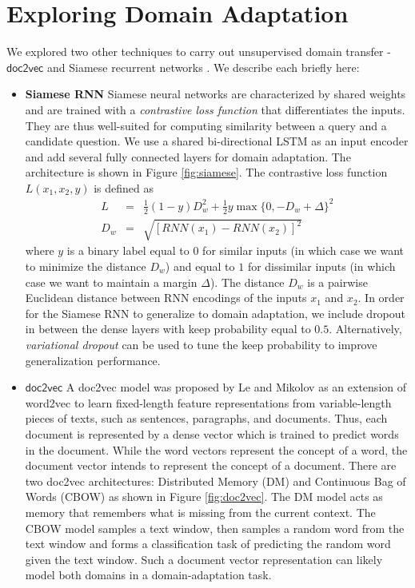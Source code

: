 \documentclass{sigkddExp}
\begin{document}
\section{Exploring Domain Adaptation}
\label{other_techniques}
We explored two other techniques to carry out unsupervised domain transfer - $\textsf{doc2vec}$ \cite{doc2vec1} and Siamese recurrent networks \cite{siamese}. We describe each briefly here:
\begin{itemize}[topsep=0pt,itemsep=-1ex,partopsep=1ex,parsep=1ex]

\item \textbf{Siamese RNN} 
 Siamese neural networks \cite{siamese} are characterized by shared weights and are trained with a \textit{contrastive loss function} that differentiates the inputs. They are thus well-suited for computing similarity between a query and a candidate question. We use a shared bi-directional LSTM as an input encoder and add several fully connected layers for domain adaptation. The architecture is shown in Figure \ref{fig:siamese}. The contrastive loss function $L(x_1,x_2,y)$ is defined as
\begin{eqnarray}
L &=& \frac{1}{2}(1-y)D_{w}^{2} + \frac{1}{2}y \max \{0, -D_w + \Delta\}^{2} \\
D_w &=& \sqrt{[RNN(x_1) - RNN(x_2)]^2}
\end{eqnarray}
where $y$ is a binary label equal to $0$ for similar inputs (in which case we want to minimize the distance $D_w$) and equal to $1$ for dissimilar inputs (in which case we want to maintain a margin $\Delta$). The distance $D_w$ is a pairwise Euclidean distance between RNN encodings of the inputs $x_1$ and $x_2$. In order for the Siamese RNN to generalize to domain adaptation, we include dropout\cite{srivastava2014dropout} in between the dense layers with keep probability equal to $0.5$. Alternatively, \textit{variational dropout}\cite{kingma2015variational} can be used to tune the keep probability to improve generalization performance.

\item \textbf{$\textsf{doc2vec}$} A \textsf{doc2vec} model was proposed by Le and Mikolov \cite{doc2vec1} as an extension of word2vec to learn fixed-length feature representations from variable-length pieces of texts, such as sentences, paragraphs, and documents. Thus, each document is represented by a dense vector which is trained to predict words in the document. While the word vectors represent the concept of a word, the document vector intends to represent the concept of a document. There are two doc2vec architectures: Distributed Memory (DM) and Continuous Bag of Words (CBOW) as shown in Figure \ref{fig:doc2vec}. The DM model acts as memory that remembers what is missing from the current context. The CBOW model samples a text window, then samples a random word from the text window and forms a classification task of predicting the random word given the text window. Such a document vector representation can likely model both domains in a domain-adaptation task.
\end{itemize}
\end{document}
